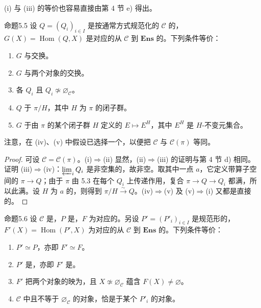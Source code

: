 (i) 与 (iii) 的等价也容易直接由第 4 节 e) 得出。
\begin{SGAresult}{命题}{5.5}
设 $Q=(Q_i)_{i\in I}$ 是按通常方式规范化的 $\mathcal C$ 的，$G(X)=\operatorname{Hom}(Q,X)$ 是对应的从 $\mathcal C$ 到 $\mathbf{Ens}$ 的。下列条件等价：
\begin{enumerate}
\item[(i)] $G$ 与交换。
\item[(ii)] $G$ 与两个对象的交换。
\item[(iii)] 各 $Q_i$ 且 $Q_i\not\simeq\varnothing_{\mathcal C}$。
\item[(iv)] $Q$ 于 $\pi/H$，其中 $H$ 为 $\pi$ 的闭子群。
\item[(v)] $G$ 于由 $\pi$ 的某个闭子群 $H$ 定义的 $E\mapsto E^H$，其中 $E^H$ 是 $H$-不变元集合。
\end{enumerate}
\end{SGAresult}
注意，在 (iv)、(v) 中假设已选择一个，以便把 $\mathcal C$ 与 $\mathcal C(\pi)$ 等同。
\begin{proof}
可设 $\mathcal C=\mathcal C(\pi)$。(i)$\Rightarrow$(ii) 显然，(ii)$\Rightarrow$(iii) 的证明与第 4 节 d) 相同。证明 (iii)$\Rightarrow$(iv)：$\varprojlim_iQ_i$ 是非空集的，故非空。取其中一点 $a$，它定义带算子空间的 $\pi\to Q$；由于 $\pi$ 由 5.3 在每个 $Q_i$ 上传递作用，复合 $\pi\to Q\to Q_i$ 都满，所以此满。设 $H$ 为 $a$ 的，则得到 $\pi/H\xrightarrow{\sim}Q$。(iv)$\Rightarrow$(v) 及 (v)$\Rightarrow$(i) 又都是直接的。
\end{proof}
\begin{SGAresult}{命题}{5.6}
设 $\mathcal C$ 是，$P$ 是，$F$ 为对应的。另设 $P'=(P'_i)_{i\in I}$ 是规范形的，$F'(X)=\operatorname{Hom}(P',X)$ 为对应的从 $\mathcal C$ 到 $\mathbf{Ens}$ 的。下列条件等价：
\begin{enumerate}
\item[(i)] $P'\simeq P$，亦即 $F'\simeq F$。
\item[(ii)] $P'$ 是，亦即 $F'$ 是。
\item[(iii)] $F'$ 把两个对象的映为，且 $X\not\simeq\varnothing_{\mathcal C}$ 蕴含 $F(X)\neq\varnothing$。
\item[(iv)] $\mathcal C$ 中且不等于 $\varnothing_{\mathcal C}$ 的对象，恰是于某个 $P'_i$ 的对象。
\end{enumerate}
\end{SGAresult}
